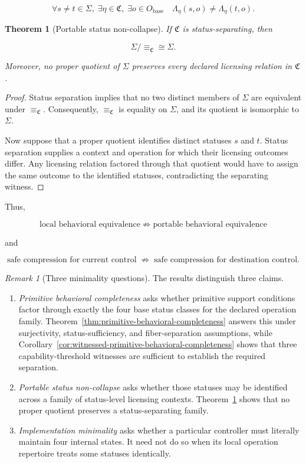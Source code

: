 \documentclass[11pt]{article}
\newtheorem{theorem}[proposition]{Theorem}
\theoremstyle{definition}
\theoremstyle{remark}
\newtheorem{remark}[proposition]{Remark}
\begin{document}
\[
\forall s\neq t\in\Sigma,\;
\exists\eta\in\mathfrak C,\;
\exists o\in O_{\mathrm{base}}
\quad
\Lambda_{\eta}(s,o)\neq\Lambda_{\eta}(t,o).
\]

\begin{theorem}[Portable status non-collapse]
\label{thm:portable-status-noncollapse}
If \(\mathfrak C\) is status-separating, then

\[
\Sigma/{\equiv_{\mathfrak C}}
\cong
\Sigma.
\]

Moreover, no proper quotient of \(\Sigma\) preserves every declared licensing relation in \(\mathfrak C\).
\end{theorem}

\begin{proof}
Status separation implies that no two distinct members of \(\Sigma\) are equivalent under \(\equiv_{\mathfrak C}\). Consequently, \(\equiv_{\mathfrak C}\) is equality on \(\Sigma\), and its quotient is isomorphic to \(\Sigma\).

Now suppose that a proper quotient identifies distinct statuses \(s\) and \(t\). Status separation supplies a context and operation for which their licensing outcomes differ. Any licensing relation factored through that quotient would have to assign the same outcome to the identified statuses, contradicting the separating witness.
\end{proof}

Thus,

\[
\boxed{
\text{local behavioral equivalence}
\;\not\Rightarrow\;
\text{portable behavioral equivalence}
}
\]

and

\[
\boxed{
\text{safe compression for current control}
\;\not\Rightarrow\;
\text{safe compression for destination control}.
}
\]

\begin{remark}[Three minimality questions]
\label{rem:three-minimalities}
The results distinguish three claims.

\begin{enumerate}[leftmargin=1.5em]
    \item \emph{Primitive behavioral completeness} asks whether primitive support conditions factor through exactly the four base status classes for the declared operation family. Theorem~\ref{thm:primitive-behavioral-completeness} answers this under surjectivity, status-sufficiency, and fiber-separation assumptions, while Corollary~\ref{cor:witnessed-primitive-behavioral-completeness} shows that three capability-threshold witnesses are sufficient to establish the required separation.
    \item \emph{Portable status non-collapse} asks whether those statuses may be identified across a family of status-level licensing contexts. Theorem~\ref{thm:portable-status-noncollapse} shows that no proper quotient preserves a status-separating family.
    \item \emph{Implementation minimality} asks whether a particular controller must literally maintain four internal states. It need not do so when its local operation repertoire treats some statuses identically.
\end{enumerate}
\end{remark}
\end{document}
